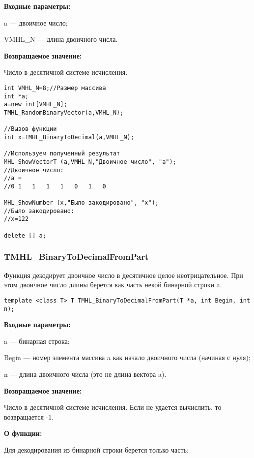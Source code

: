 \documentclass[a4paper,12pt]{article}
\begin{document}
\textbf{Входные параметры:}
 
 a --- двоичное число;
 
 VMHL\_N --- длина двоичного числа.
 
\textbf{Возвращаемое значение:}

 Число в десятичной системе исчисления.


\begin{lstlisting}[label=code_use_TMHL_BinaryToDecimal,caption=Пример использования]
int VMHL_N=8;//Размер массива
int *a;
a=new int[VMHL_N];
TMHL_RandomBinaryVector(a,VMHL_N);

//Вызов функции
int x=TMHL_BinaryToDecimal(a,VMHL_N);

//Используем полученный результат
MHL_ShowVectorT (a,VMHL_N,"Двоичное число", "a");
//Двоичное число:
//a =
//0	1	1	1	1	0	1	0

MHL_ShowNumber (x,"Было закодировано", "x");
//Было закодировано:
//x=122

delete [] a;
\end{lstlisting}

\subsubsection{TMHL\_BinaryToDecimalFromPart}\label{TMHL_BinaryToDecimalFromPart}

Функция декодирует двоичное число в десятичное целое неотрицательное. При этом двоичное число длины  берется как часть некой бинарной строки a.


\begin{lstlisting}[label=code_syntax_TMHL_BinaryToDecimalFromPart,caption=Синтаксис]
template <class T> T TMHL_BinaryToDecimalFromPart(T *a, int Begin, int n);
\end{lstlisting}

\textbf{Входные параметры:}
 
 a --- бинарная строка;
 
 Begin --- номер элемента массива a как начало двоичного числа (начиная с нуля);
 
 n --- длина двоичного числа (это не длина вектора a).
 
\textbf{Возвращаемое значение:}

 Число в десятичной системе исчисления. Если не удается вычислить, то возвращается -1.
 
\textbf{О функции:}

 Для декодирования из бинарной строки берется только часть:
 
\end{document}
